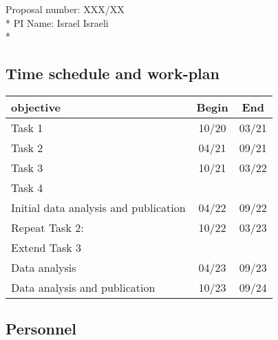 \documentclass[a4paper,12pt]{report}
\begin{document}
\noindent Proposal number: XXX/XX\\*
PI Name: Israel Israeli \\*
 
\vspace{-2em}

\subsection*{Time schedule and work-plan}
\begin{table}[ht!]
\centering
\begin{tabular}{|l|c|c|}
\hline
\textbf{objective} & \textbf{Begin} & \textbf{End} \\
\hline
Task 1 & 10/20 & 03/21 \\
\hline
Task 2& 04/21 & 09/21 \\
\hline
Task 3 & 10/21 & 03/22 \\
Task 4 & &\\
\hline
Initial data analysis and publication & 04/22 & 09/22 \\
\hline
Repeat Task 2:  & 10/22 & 03/23 \\
Extend Task 3 & & \\
\hline
Data analysis & 04/23 & 09/23 \\
\hline
Data analysis and publication & 10/23 & 09/24 \\
\hline
\end{tabular}
\end{table}

\subsection*{Personnel}
\end{document}
